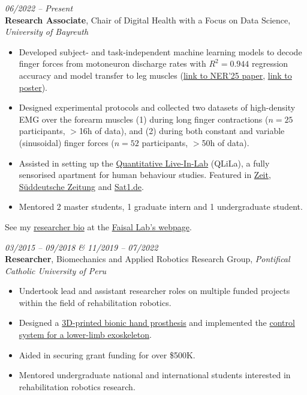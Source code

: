 \documentclass[a4paper,10pt]{article}
\newcommand{\cvdate}[1]{\textit{#1}}
\begin{document}
\cvdate{06/2022 -- Present}\\
\textbf{Research Associate}, Chair of Digital Health with a Focus on Data Science,
\textit{University of Bayreuth}
\begin{itemize}
  \item Developed subject- and task-independent machine learning models to decode finger forces
        from motoneuron discharge rates with $R^2{=}0.944$ regression accuracy and model transfer
        to leg muscles
        (\href{https://cmsfiles.s3.amazonaws.com/ner2025/proceedings/61569_CFP25CNE-ART/pdfs/0001194.pdf}{link to NER'25 paper},
        \href{https://drive.google.com/file/d/1Bf5zGzO_efQ2zlAygwavf4fBbF0I2lSK/view}{link to poster}).
  \item Designed experimental protocols and collected two datasets of high-density EMG over the
        forearm muscles (1) during long finger contractions ($n{=}25$ participants, $>$16h of
        data), and (2) during both constant and variable (sinusoidal) finger forces ($n{=}52$
        participants, $>$50h of data).
  \item Assisted in setting up the
        \href{https://www.digital-health.uni-bayreuth.de/en/research/live-in-lab/index.html}{Quantitative Live-In-Lab}
        (QLiLa), a fully sensorised apartment for human behaviour studies. Featured in
        \href{https://www.zeit.de/news/2023-12/03/wohnungen-als-ki-labor-forschung-zu-menschlichem-verhalten}{Zeit},
        \href{https://www.sueddeutsche.de/bayern/wissenschaft-kulmbach-uni-erforscht-menschliches-verhalten-wohnungen-als-ki-labor-dpa.urn-newsml-dpa-com-20090101-231203-99-168170}{S\"uddeutsche Zeitung} and
        \href{https://www.sat1.de/serien/1730-sat1-bayern/videos/ki-projekt-in-kulmbach-erstes-live-in-lab-gestartet-7377152}{Sat1.de}.
  \item Mentored 2 master students, 1 graduate intern and 1 undergraduate student.
\end{itemize}
See my \href{https://faisallab.org/members/renato-mio}{researcher bio} at the
\href{https://faisallab.org/}{Faisal Lab's webpage}.

\vspace{4pt}
\cvdate{03/2015 -- 09/2018 \& 11/2019 -- 07/2022}\\
\textbf{Researcher}, Biomechanics and Applied Robotics Research Group,
\textit{Pontifical Catholic University of Peru}
\begin{itemize}
  \item Undertook lead and assistant researcher roles on multiple funded projects within the field
        of rehabilitation robotics.
  \item Designed a
        \href{https://ieeexplore.ieee.org/abstract/document/7942665}{3D-printed bionic hand prosthesis}
        and implemented the
        \href{https://link.springer.com/chapter/10.1007/978-3-030-16423-2_8}{control system for a lower-limb exoskeleton}.
  \item Aided in securing grant funding for over \$500K.
  \item Mentored undergraduate national and international students interested in rehabilitation
        robotics research.
\end{itemize}
\end{document}
